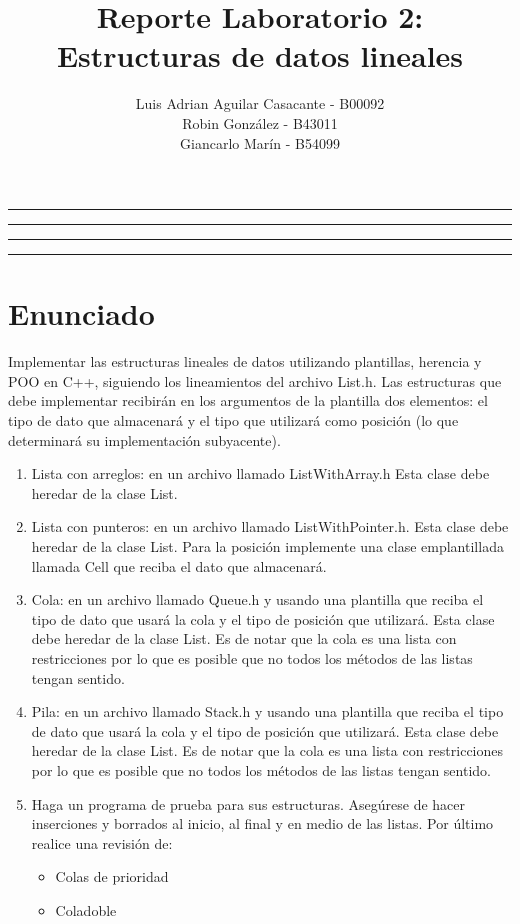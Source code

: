 \documentclass[11pt]{article}
\title{Reporte Laboratorio 2: \\ Estructuras de datos lineales}
\author{Luis Adrian Aguilar Casacante - B00092\\Robin González - B43011\\Giancarlo Marín - B54099}
\begin{document}
\maketitle
\hrule
\hrule
\tableofcontents
\hspace{5mm}
\hrule
\hrule

\hfill
\hfill
\newpage
\section{Enunciado}
Implementar las estructuras lineales de datos utilizando plantillas, herencia y POO en C++, siguiendo los lineamientos del archivo List.h. Las estructuras que debe implementar recibirán en los argumentos de la plantilla dos elementos: el tipo de dato que almacenará y el tipo que utilizará como posición (lo que determinará su implementación subyacente).\\
\begin{enumerate}
\item Lista con arreglos: en un archivo llamado ListWithArray.h Esta clase debe heredar de la clase List.
\item Lista con punteros: en un archivo llamado ListWithPointer.h. Esta clase debe heredar de la clase List. Para la posición implemente una clase emplantillada llamada Cell que reciba el dato que almacenará.
\item Cola: en un archivo llamado Queue.h y usando una plantilla que reciba el tipo de dato que usará la cola y el tipo de posición que utilizará. Esta clase debe heredar de la clase List. Es de notar que la cola es una lista con restricciones por lo que es posible que no todos los métodos de las listas tengan sentido.
\item Pila: en un archivo llamado Stack.h y usando una plantilla que reciba el tipo de dato que usará la cola y el tipo de posición que utilizará. Esta clase debe heredar de la clase List. Es de notar que la cola es una lista con restricciones por lo que es posible que no todos los métodos de las listas tengan sentido.
\item Haga un programa de prueba para sus estructuras. Asegúrese de hacer inserciones y borrados al inicio, al final y en medio de las listas. Por último realice una revisión de:
\begin{itemize}
\item Colas de prioridad
\item Coladoble
\end{itemize}
\end{enumerate}
\end{document}
